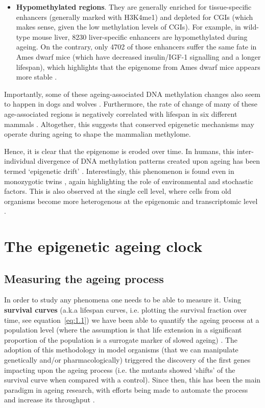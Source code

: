 \begin{itemize}
	\item \textbf{Hypomethylated regions}. They are generally enriched for tissue-specific enhancers (generally marked with H3K4me1) and depleted for \acrshort{CGI}s (which makes sense, given the low methylation levels of CGIs). For example, in wild-type mouse liver, 8230 liver-specific enhancers are hypomethylated during ageing. On the contrary, only 4702 of those enhancers suffer the same fate in Ames dwarf mice (which have decreased insulin/IGF-1 signalling and a longer lifespan), which highlights that the epigenome from Ames dwarf mice appears more stable \cite{Cole2017}.     
	
\end{itemize} 

Importantly, some of these ageing-associated DNA methylation changes also seem to happen in dogs and wolves \cite{Thompson2017}. Furthermore, the rate of change of many of these age-associated regions is negatively correlated with lifespan in six different mammals \cite{Lowe2018}. Altogether, this suggests that conserved epigenetic mechanisms may operate during ageing to shape the mammalian methylome.

\bigskip

Hence, it is clear that the epigenome is eroded over time. In humans, this inter-individual divergence of DNA methylation patterns created upon ageing has been termed `epigenetic drift' \cite{West2013}. Interestingly, this phenomenon is found even in monozygotic twins \cite{Fraga2005,Talens2012}, again highlighting the role of environmental and stochastic factors. This is also observed at the single cell level, where cells from old organisms become more heterogenous at the epigenomic and transcriptomic level \cite{Hernando-Herraez2018,Martinez-Jimenez2017}.

\bigskip

\section{The epigenetic ageing clock}

\subsection{Measuring the ageing process}

\smallskip

In order to study any phenomena one needs to be able to measure it. Using \textbf{survival curves} (a.k.a lifespan curves, i.e. plotting the survival fraction over time, see equation~\ref{eq:1.1}) we have been able to quantify the ageing process at a population level (where the assumption is that life extension in a significant proportion of the population is a surrogate marker of slowed ageing) \cite{Johnson2013}. The adoption of this methodology in model organisms (that we can manipulate genetically and/or pharmacologically) triggered the discovery of the first genes impacting upon the ageing process (i.e. the mutants showed `shifts' of the survival curve when compared with a control). Since then, this has been the main paradigm in ageing research, with efforts being made to automate the process and increase its throughput \cite{Stroustrup2013}.

